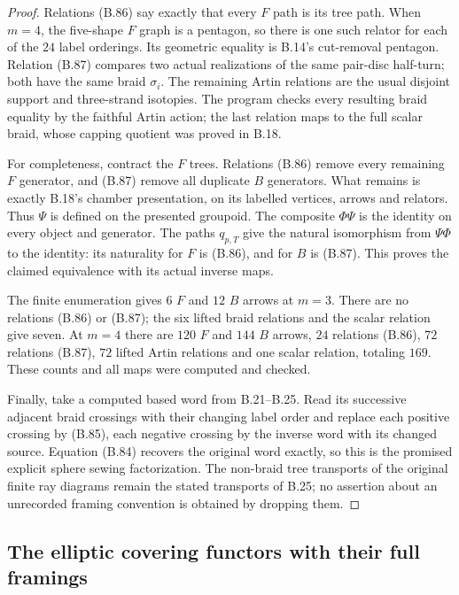 \begin{proof}
Relations (B.86) say exactly that every $F$ path is
its tree path.  When $m=4$, the five-shape $F$ graph
is a pentagon, so there is one such relator for each
of the $24$ label orderings.  Its geometric equality
is B.14's cut-removal pentagon.  Relation (B.87)
compares two actual realizations of the same pair-disc
half-turn; both have the same braid $\sigma_i$.
The remaining Artin relations are the usual disjoint
support and three-strand isotopies.  The program checks
every resulting braid equality by the faithful Artin
action; the last relation maps to the full scalar braid,
whose capping quotient was proved in B.18.

For completeness, contract the $F$ trees.  Relations
(B.86) remove every remaining $F$ generator, and
(B.87) remove all duplicate $B$ generators.  What
remains is exactly B.18's chamber presentation, on
its labelled vertices, arrows and relators.  Thus
$\Psi$ is defined on the presented groupoid.
The composite $\Phi\Psi$ is the identity on every
object and generator.  The paths $q_{p,T}$ give
the natural isomorphism from $\Psi\Phi$ to the
identity: its naturality for $F$ is (B.86), and
for $B$ is (B.87).  This proves the claimed
equivalence with its actual inverse maps.

The finite enumeration gives $6$ $F$ and $12$ $B$
arrows at $m=3$.  There are no relations (B.86) or
(B.87); the six lifted braid relations and the
scalar relation give seven.  At $m=4$ there are
$120$ $F$ and $144$ $B$ arrows, $24$ relations
(B.86), $72$ relations (B.87), $72$ lifted Artin
relations and one scalar relation, totaling $169$.
These counts and all maps were computed and checked.

Finally, take a computed based word from B.21--B.25.
Read its successive adjacent braid crossings with
their changing label order and replace each positive
crossing by (B.85), each negative crossing by the
inverse word with its changed source.  Equation
(B.84) recovers the original word exactly, so this
is the promised explicit sphere sewing factorization.
The non-braid tree transports of the original finite
ray diagrams remain the stated transports of B.25;
no assertion about an unrecorded framing convention
is obtained by dropping them.
\end{proof}

\subsection{The elliptic covering functors with their full framings}

